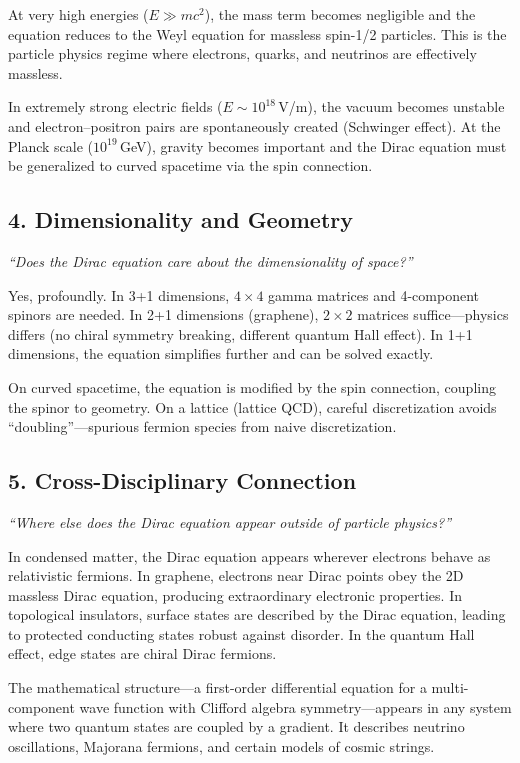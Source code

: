 \documentclass[11pt,openright]{book}
\begin{document}
At very high energies ($E \gg mc^2$), the mass term becomes negligible and the equation reduces to the Weyl equation for massless spin-1/2 particles. This is the particle physics regime where electrons, quarks, and neutrinos are effectively massless.

In extremely strong electric fields ($E \sim 10^{18}$\,V/m), the vacuum becomes unstable and electron--positron pairs are spontaneously created (Schwinger effect). At the Planck scale ($10^{19}$\,GeV), gravity becomes important and the Dirac equation must be generalized to curved spacetime via the spin connection.

\subsection*{4. Dimensionality and Geometry}
\textit{``Does the Dirac equation care about the dimensionality of space?''}

Yes, profoundly. In 3+1 dimensions, $4\times 4$ gamma matrices and 4-component spinors are needed. In 2+1 dimensions (graphene), $2\times 2$ matrices suffice---physics differs (no chiral symmetry breaking, different quantum Hall effect). In 1+1 dimensions, the equation simplifies further and can be solved exactly.

On curved spacetime, the equation is modified by the spin connection, coupling the spinor to geometry. On a lattice (lattice QCD), careful discretization avoids ``doubling''---spurious fermion species from naive discretization.

\subsection*{5. Cross-Disciplinary Connection}
\textit{``Where else does the Dirac equation appear outside of particle physics?''}

In condensed matter, the Dirac equation appears wherever electrons behave as relativistic fermions. In graphene, electrons near Dirac points obey the 2D massless Dirac equation, producing extraordinary electronic properties. In topological insulators, surface states are described by the Dirac equation, leading to protected conducting states robust against disorder. In the quantum Hall effect, edge states are chiral Dirac fermions.

The mathematical structure---a first-order differential equation for a multi-component wave function with Clifford algebra symmetry---appears in any system where two quantum states are coupled by a gradient. It describes neutrino oscillations, Majorana fermions, and certain models of cosmic strings.
\end{document}
